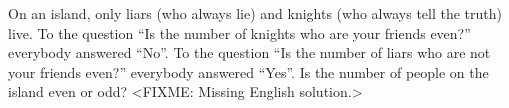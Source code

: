 \problem
On an island, only liars (who always lie) and knights (who always tell the
truth) live.
To the question ``Is the number of knights who are your friends even?''
everybody answered ``No''.
To the question ``Is the number of liars who are not your friends even?''
everybody answered ``Yes''.
Is the number of people on the island even or odd?
\solution
<FIXME: Missing English solution.>
\endproblem
